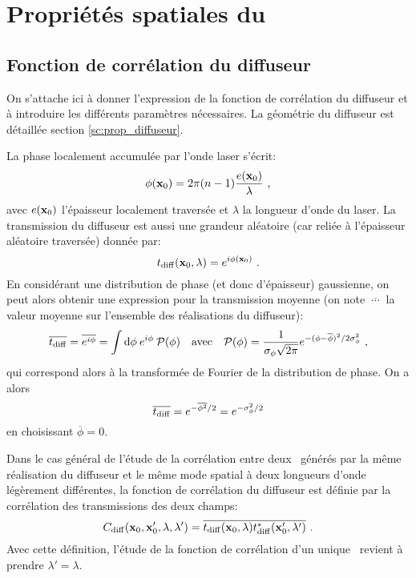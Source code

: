 
\chapter{Propriétés spatiales du \speckle}
\label{ch:anex_speckle}


\section{Fonction de corrélation du diffuseur}
On s'attache ici à donner l'expression de la fonction de corrélation du diffuseur et à introduire les différents paramètres nécessaires. La géométrie du diffuseur est détaillée section \ref{sc:prop_diffuseur}.

La phase localement accumulée par l'onde laser s'écrit:
\begin{equation}
\phi(\mathbf{x}_0)=2\pi (n-1) \frac{e(\mathbf{x}_0)}{\lambda} \text{ ,}
\end{equation}
avec $e(\mathbf{x}_0)$ l'épaisseur localement traversée et $\lambda$ la longueur d'onde du laser. La transmission du diffuseur est aussi une grandeur aléatoire (car reliée à l'épaisseur aléatoire traversée) donnée par:
\begin{equation}
t_{\mathrm{diff}}(\mathbf{x}_0,\lambda)=e^{i \phi(\mathbf{x}_0)} \text{ .}
\end{equation}
En considérant une distribution de phase (et donc d'épaisseur) gaussienne, on peut alors obtenir une expression pour la transmission moyenne (on note $\overline{\:\cdots\:}$ la valeur moyenne sur l'ensemble des réalisations du diffuseur):
\begin{equation}
\overline{t_{\mathrm{diff}}}= \overline{e^{i \phi}} = \int{ \mathrm{d}\phi \: e^{i \phi} \: \mathcal{P}(\phi)} \quad \text{avec} \quad \mathcal{P}(\phi) = \frac{1}{\sigma_{\phi} \sqrt{2 \pi}} e^{-(\phi - \overline{\phi})^2 /2 \sigma_{\phi}^2} \text{ ,}
\end{equation}
qui correspond alors à la transformée de Fourier de la distribution de phase. On a alors
\begin{equation}
\overline{t_{\mathrm{diff}}} = e^{-\overline{\phi^2}/2} = e^{-\sigma_{\phi}^2/2}
\end{equation}
en choisissant $\overline{\phi}=0$. 

Dans le cas général de l'étude de la corrélation entre deux \speckles\ générés par la même réalisation du diffuseur et le même mode spatial à deux longueurs d'onde légèrement différentes, la fonction de corrélation du diffuseur est définie par la corrélation des transmissions des deux champs:
\begin{equation}
C_{\mathrm{diff}}(\mathbf{x}_0,\mathbf{x}_0',\lambda,\lambda')=\overline{t_{\mathrm{diff}}(\mathbf{x}_0,\lambda)t_{\mathrm{diff}}^*(\mathbf{x}_0',\lambda')} \text{ .}
\end{equation}
Avec cette définition, l'étude de la fonction de corrélation d'un unique \speckle\ revient à prendre $\lambda'=\lambda$. 

